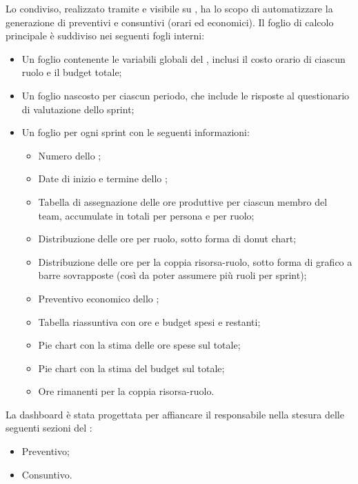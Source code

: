 Lo  condiviso, realizzato tramite  e visibile su , ha lo scopo di automatizzare la generazione di preventivi e consuntivi (orari ed economici). Il foglio di calcolo principale è suddiviso nei seguenti fogli interni:
\begin{itemize}
  \item Un foglio contenente le variabili globali del \PdP, inclusi il costo orario di ciascun ruolo e il budget totale;
  \item Un foglio nascosto per ciascun periodo, che include le risposte al questionario di valutazione dello sprint;
  \item Un foglio per ogni sprint con le seguenti informazioni:
  \begin{itemize}
    \item Numero dello ;
    \item Date di inizio e termine dello ;
    \item Tabella di assegnazione delle ore produttive per ciascun membro del team, accumulate in totali per persona e per ruolo;
    \item Distribuzione delle ore per ruolo, sotto forma di donut chart;
    \item Distribuzione delle ore per la coppia risorsa-ruolo, sotto forma di grafico a barre sovrapposte (così da poter assumere più ruoli per sprint);
    \item Preventivo economico dello ;
    \item Tabella riassuntiva con ore e budget spesi e restanti;
    \item Pie chart con la stima delle ore spese sul totale;
    \item Pie chart con la stima del budget sul totale;
    \item Ore rimanenti per la coppia risorsa-ruolo.
  \end{itemize}
\end{itemize}
\vspace{0.5\baselineskip}
\par La dashboard è stata progettata per affiancare il responsabile nella stesura delle seguenti sezioni del \PdP:
\begin{itemize}
  \item Preventivo;
  \item Consuntivo.
\end{itemize}

